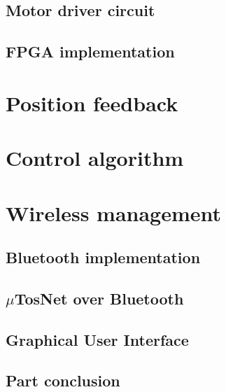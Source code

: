 \subsection{Motor driver circuit}




%
\subsection{FPGA implementation}



%
\clearpage
\section{Position feedback}

%
\clearpage
\section{Control algorithm}
\label{chapter:control_algorithm}

%
\clearpage
\section{Wireless management}

%
%
\subsection{Bluetooth implementation}\label{tosnetblue}
\label{subsec:bluetooth-implementation}

%
\subsection{$\mu$TosNet over Bluetooth}
\label{subsec:tosnet}

%
\subsection{Graphical User Interface}

%
\subsection{Part conclusion}

%
%
